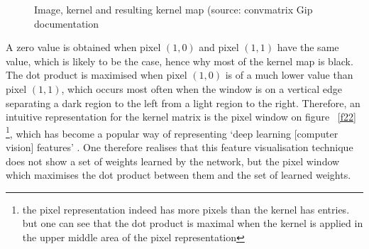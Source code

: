 \documentclass[a4paper,11pt]{article}
\begin{document}
\begin{figure}[h]
    \caption{Image, kernel and resulting kernel map (source: convmatrix Gip documentation}
    \label{f21}
\end{figure}

A zero value is obtained when pixel $(1,0)$ and pixel $(1,1)$ have the same value, which is likely to be the case, hence why most of the kernel map is black. The dot product is maximised when pixel $(1,0)$ is of a much lower value than pixel $(1,1)$, which occurs most often when the window is on a vertical edge separating a dark region to the left from a light region to the right. Therefore, an intuitive representation for the kernel matrix is the pixel window on figure ~\ref{f22} \footnote{the pixel representation indeed has more pixels than the kernel has entries. but one can see that the dot product is maximal when the kernel is applied in the upper middle area of the pixel representation}, which has become a popular way of representing `deep learning [computer vision] features' \cite{zeiler_fergus}. One therefore realises that this feature visualisation technique does not show a set of weights learned by the network, but the pixel window which maximises the dot product between them and the set of learned weights.
\end{document}
